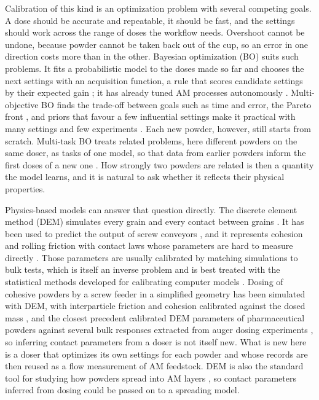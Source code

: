 \documentclass[preprint,12pt]{elsarticle}
\begin{document}
Calibration of this kind is an optimization problem with several competing goals. A dose should be accurate and repeatable, it should be fast, and the settings should work across the range of doses the workflow needs. Overshoot cannot be undone, because powder cannot be taken back out of the cup, so an error in one direction costs more than in the other. Bayesian optimization (BO) suits such problems. It fits a probabilistic model to the doses made so far and chooses the next settings with an acquisition function, a rule that scores candidate settings by their expected gain \cite{Shahriari2016Taking,Liang2021Benchmarking,Baird2026Honegumi}; it has already tuned AM processes autonomously \cite{Deneault2021Toward}. Multi-objective BO finds the trade-off between goals such as time and error, the Pareto front \cite{Daulton2021Parallel}, and priors that favour a few influential settings make it practical with many settings and few experiments \cite{Eriksson2021High}. Each new powder, however, still starts from scratch. Multi-task BO treats related problems, here different powders on the same doser, as tasks of one model, so that data from earlier powders inform the first doses of a new one \cite{Bonilla2008Multi,Swersky2013Multi,Taylor2023Accelerated}. How strongly two powders are related is then a quantity the model learns, and it is natural to ask whether it reflects their physical properties.

Physics-based models can answer that question directly. The discrete element method (DEM) simulates every grain and every contact between grains \cite{Cundall1979Discrete,Zhu2008Discrete}. It has been used to predict the output of screw conveyors \cite{Owen2009Prediction}, and it represents cohesion and rolling friction with contact laws whose parameters are hard to measure directly \cite{Johnson1971Surface,Thakur2014Micromechanical,Ai2011Assessment}. Those parameters are usually calibrated by matching simulations to bulk tests, which is itself an inverse problem \cite{Coetzee2017Review,Richter2020Development,Benvenuti2016Identification,Cheng2019Iterative} and is best treated with the statistical methods developed for calibrating computer models \cite{Kennedy2001Bayesian,Higdon2008Computer}. Dosing of cohesive powders by a screw feeder in a simplified geometry has been simulated with DEM, with interparticle friction and cohesion calibrated against the dosed mass \cite{Imole2016Experiments}, and the closest precedent calibrated DEM parameters of pharmaceutical powders against several bulk responses extracted from auger dosing experiments \cite{ElKassem2021Semi,ElKassem2021Sensitivity}, so inferring contact parameters from a doser is not itself new. What is new here is a doser that optimizes its own settings for each powder and whose records are then reused as a flow measurement of AM feedstock. DEM is also the standard tool for studying how powders spread into AM layers \cite{Haeri2017Optimisation,Nan2018Jamming,Meier2019Critical,Shaheen2021Influence}, so contact parameters inferred from dosing could be passed on to a spreading model.
\end{document}
